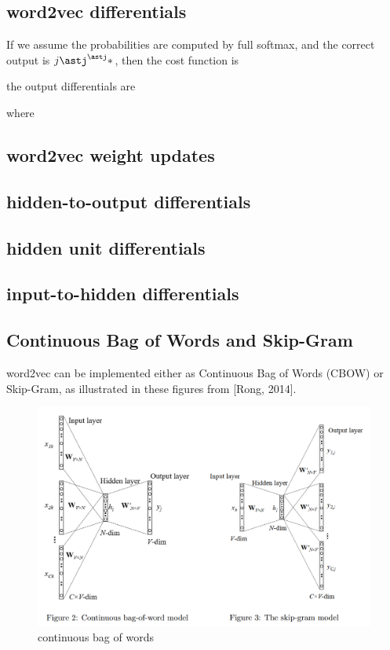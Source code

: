 \documentclass[11pt]{article}
\begin{document}
\subsection{word2vec differentials}\label{subsec:word2vec-differentials}
If we assume the probabilities are computed by full softmax, and the correct output is $j\astj^\astj\ast$, then the cost function is

the output differentials are

where

\subsection{word2vec weight updates}\label{subsec:word2vec-weight-updates}

\subsection{hidden-to-output differentials}\label{subsec:hidden-to-output-differentials}

\subsection{hidden unit differentials}\label{subsec:hidden-unit-differentials}

\subsection{input-to-hidden differentials}\label{subsec:input-to-hidden-differentials}

\subsection{Continuous Bag of Words and Skip-Gram}\label{subsec:continuous-bag-of-words-and-skip-gram}
word2vec can be implemented either as Continuous Bag of Words (CBOW) or Skip-Gram, as illustrated in these figures from [Rong, 2014].

\begin{figure}[H]
    \centering
    \includegraphics{../out/images/continuous-bag-of-words}
    \caption[continuous bag of words]{continuous bag of words}
    \label{fig:continuous bag of words}
\end{figure}
\end{document}
